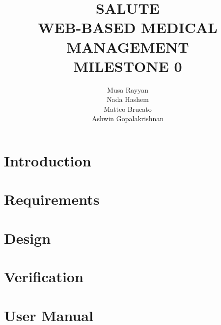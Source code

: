 \documentclass[10pt]{report}
\title{SALUTE \\ WEB-BASED MEDICAL MANAGEMENT \\ MILESTONE 0}
\author{Musa Rayyan \\ Nada Hashem \\ Matteo Brucato \\ Ashwin Gopalakrishnan}
\begin{document}
\maketitle
\tableofcontents

\part{Introduction}


\part{Requirements}


\part{Design}


\part{Verification}


\part{User Manual}


\appendix

\end{document}
